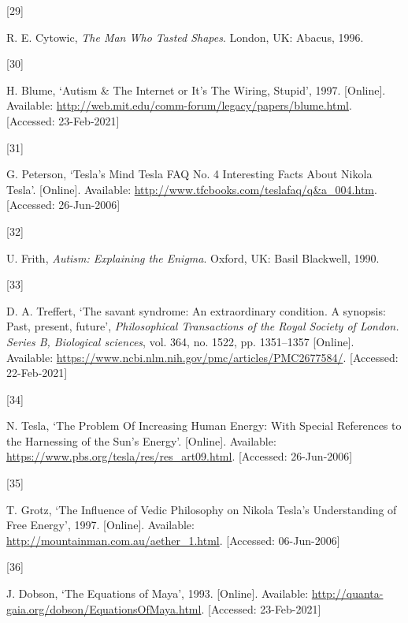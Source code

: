 \documentclass[
  a4paper,
]{article}
\newlength{\cslhangindent}
\newlength{\csllabelwidth}
\newlength{\cslentryspacingunit} %
\newenvironment{CSLReferences}[2] %
 {%
  \setlength{\parindent}{0pt}
  \ifodd #1
  \let\oldpar\par
  \def\par{\hangindent=\cslhangindent\oldpar}
  \fi
  \setlength{\parskip}{#2\cslentryspacingunit}
 }%
 {}
\newcommand{\CSLLeftMargin}[1]{\parbox[t]{\csllabelwidth}{#1}}
\newcommand{\CSLRightInline}[1]{\parbox[t]{\linewidth - \csllabelwidth}{#1}\break}
\begin{document}
\begin{CSLReferences}{0}{0}
\leavevmode{}%
\CSLLeftMargin{{[}29{]} }
\CSLRightInline{R. E. Cytowic, \emph{{The Man Who Tasted Shapes}}.
London, UK: Abacus, 1996. }

\leavevmode{}%
\CSLLeftMargin{{[}30{]} }
\CSLRightInline{H. Blume, {`{Autism \& The Internet or It's The Wiring,
Stupid}'}, 1997. {[}Online{]}. Available:
\url{http://web.mit.edu/comm-forum/legacy/papers/blume.html}.
{[}Accessed: 23-Feb-2021{]}}

\leavevmode{}%
\CSLLeftMargin{{[}31{]} }
\CSLRightInline{G. Peterson, {`{Tesla's Mind \textbar{} Tesla FAQ No. 4
\textbar{} Interesting Facts About Nikola Tesla}'}. {[}Online{]}.
Available: \url{http://www.tfcbooks.com/teslafaq/q\&a_004.htm}.
{[}Accessed: 26-Jun-2006{]}}

\leavevmode{}%
\CSLLeftMargin{{[}32{]} }
\CSLRightInline{U. Frith, \emph{{Autism: Explaining the Enigma}}.
Oxford, UK: Basil Blackwell, 1990. }

\leavevmode{}%
\CSLLeftMargin{{[}33{]} }
\CSLRightInline{D. A. Treffert, {`The savant syndrome: An extraordinary
condition. A synopsis: Past, present, future'}, \emph{Philosophical
Transactions of the Royal Society of London. Series B, Biological
sciences}, vol. 364, no. 1522, pp. 1351--1357 {[}Online{]}. Available:
\url{https://www.ncbi.nlm.nih.gov/pmc/articles/PMC2677584/}.
{[}Accessed: 22-Feb-2021{]}}

\leavevmode{}%
\CSLLeftMargin{{[}34{]} }
\CSLRightInline{N. Tesla, {`{The Problem Of Increasing Human Energy:
With Special References to the Harnessing of the Sun's Energy}'}.
{[}Online{]}. Available:
\url{https://www.pbs.org/tesla/res/res_art09.html}. {[}Accessed:
26-Jun-2006{]}}

\leavevmode{}%
\CSLLeftMargin{{[}35{]} }
\CSLRightInline{T. Grotz, {`{The Influence of Vedic Philosophy on Nikola
Tesla's Understanding of Free Energy}'}, 1997. {[}Online{]}. Available:
\url{http://mountainman.com.au/aether_1.html}. {[}Accessed:
06-Jun-2006{]}}

\leavevmode{}%
\CSLLeftMargin{{[}36{]} }
\CSLRightInline{J. Dobson, {`{The Equations of Maya}'}, 1993.
{[}Online{]}. Available:
\url{http://quanta-gaia.org/dobson/EquationsOfMaya.html}. {[}Accessed:
23-Feb-2021{]}}


\end{CSLReferences}
\end{document}
